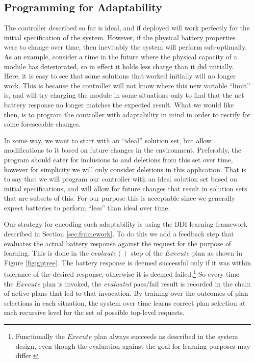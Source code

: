 \subsection{Programming for Adaptability}\label{subsec:constraints}

The controller described so far is ideal, and if deployed will work perfectly for the initial specification of the system. However, if the physical battery properties were to change over time, then inevitably the system will perform sub-optimally. As an example, consider a time in the future where the  physical capacity of a module has deteriorated, so in effect it holds less charge than it did initially. Here, it is easy to see that some solutions that worked initially will no longer work. This is because the controller will not know where this new variable ``limit'' is, and will try charging the module in some situations only to find that the net battery response no longer matches the expected result. What we would like then, is to program the controller with adaptability in mind in order to rectify for some foreseeable changes.

In some way, we want to start with an ``ideal'' solution set, but allow modifications to it based on future changes in the environment. Preferably, the program should cater for inclusions to and deletions from this set over time, however for simplicity we will only consider deletions in this application. That is to say that we will program our controller with an ideal solution set based on initial specifications, and will allow for future changes that result in solution sets that are subsets of this. For our purpose this is acceptable since we generally expect batteries to perform ``less'' than ideal over time.

Our strategy for encoding such adaptability is using the BDI learning framework described in Section \ref{sec:framework}. To do this we add a feedback step that evaluates the actual battery response against the request for the purpose of learning. This is done in the $evalaute()$ step of the $Execute$ plan as shown in Figure \ref{fig:gptree}. The battery response is deemed successful only if it was within tolerance of the desired response, otherwise it is deemed failed.\footnote{Functionally the $Execute$ plan always succeeds as described in the system design, even though the evaluation against the goal for learning purposes may differ.} So every time the $Execute$ plan is invoked, the {\em evaluated} pass/fail result is recorded in the chain of active plans that led to that invocation. By training over the outcomes of plan selections in each situation, the system over time learns correct plan selection at each recursive level for the set of possible top-level requests. 

